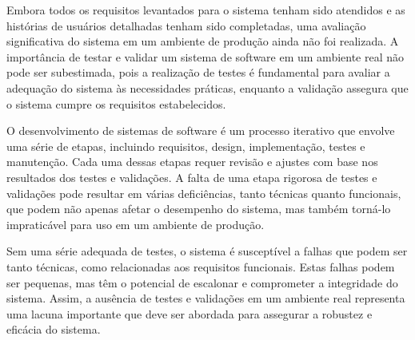 Embora todos os requisitos levantados para o sistema tenham sido atendidos e as histórias de usuários detalhadas tenham sido completadas, uma avaliação significativa do sistema em um ambiente de produção ainda não foi realizada. A importância de testar e validar um sistema de software em um ambiente real não pode ser subestimada, pois a realização de testes é fundamental para avaliar a adequação do sistema às necessidades práticas, enquanto a validação assegura que o sistema cumpre os requisitos estabelecidos. 

O desenvolvimento de sistemas de software é um processo iterativo que envolve uma série de etapas, incluindo requisitos, design, implementação, testes e manutenção. Cada uma dessas etapas requer revisão e ajustes com base nos resultados dos testes e validações. A falta de uma etapa rigorosa de testes e validações pode resultar em várias deficiências, tanto técnicas quanto funcionais, que podem não apenas afetar o desempenho do sistema, mas também torná-lo impraticável para uso em um ambiente de produção.

Sem uma série adequada de testes, o sistema é susceptível a falhas que podem ser tanto técnicas, como relacionadas aos requisitos funcionais. Estas falhas podem ser pequenas, mas têm o potencial de escalonar e comprometer a integridade do sistema. Assim, a ausência de testes e validações em um ambiente real representa uma lacuna importante que deve ser abordada para assegurar a robustez e eficácia do sistema.
